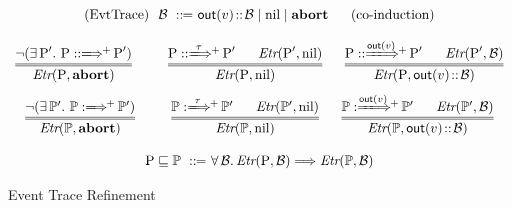 \begin{figure*}[!t]
    \centering
    \[
        \begin{array}{c}
            \TYPE{(EvtTrace)} \ \ \evttr \ \define \ 
            \outEvt{\val} \stCons \evttr \sepline \nil \sepline 
            \evtabort \quad \ \ \TYPE{(co-induction)} \\
            \\
            \infer=
            {
                \Etr{(\prog, \evtabort)}
            }
            {
                \neg
                (\exists \, \prog'. \ 
                 \LGlobMultiTrans{\prog}{}{+}{\prog'})
            } \qquad \ \ 
            \infer= 
            {
                \Etr{(\prog, \nil)}
            }
            {
                \LGlobMultiTrans{\prog}{ \, \empmsg \ }{+}{\prog'} 
                \quad \ \ 
                \Etr{(\prog', \nil)}
            } \quad \ \ 
            \infer=
            {
                \Etr{(\prog, \outEvt{\val} \stCons \evttr)}
            }
            {
                \LGlobMultiTrans{\prog}{\!\!\outEvt{\val}\!}{+}{\prog'}
                \quad \ \ 
                \Etr{(\prog', \evttr)}
            } \\
            \\[-5pt]
            \infer=
            {
                \Etr{(\HProg, \evtabort)}
            }
            {
                \neg
                (\exists \, \HProg'. \ 
                 \HGlobMultiTrans{\HProg}{}{+}{\HProg'})
            } \qquad \ \ 
            \infer= 
            {
                \Etr{(\HProg, \nil)}
            }
            {
                \HGlobMultiTrans{\HProg}{ \, \empmsg \ }{+}{\HProg'} 
                \quad \ \ 
                \Etr{(\HProg', \nil)}
            } \quad \ \ 
            \infer=
            {
                \Etr{(\HProg, \outEvt{\val} \stCons \evttr)}
            }
            {
                \HGlobMultiTrans{\HProg}{\!\!\outEvt{\val}\!}{+}{\HProg'}
                \quad \ \ 
                \Etr{(\HProg', \evttr)}
            } \\
            \\
            \prog \refine \HProg \ \define \ 
                \forall \, \evttr. \, 
                \Etr{(\prog, \evttr)} \Longrightarrow
                \Etr{(\HProg, \evttr)}  
        \end{array}
    \]
    \caption{Event Trace Refinement}
    \label{fig:event-trace-refinement}
\end{figure*}

